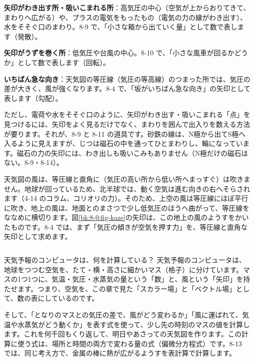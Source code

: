\begin{enumerate}[label={\bkcircled[\bkTT]{\arabic*}}, leftmargin=2.4\zw, itemsep=2pt, topsep=2pt]
\item \textbf{矢印がわき出す所・吸いこまれる所}：高気圧の中心（空気が上からおりてきて、まわりへ広がる）や、プラスの電気をもったもの（電気の力の線がわき出す）、水をそそぐ口のまわり。8-9 で、「小さな箱から出ていく量」として数で表します（発散）。
\item \textbf{矢印がうずを巻く所}：低気圧や台風の中心。8-10 で、「小さな風車が回るかどうか」として数で表します（回転）。
\item \textbf{いちばん急な向き}：天気図の等圧線（気圧の等高線）のつまった所では、気圧の差が大きく、風が強くなります。8-4 で、「坂がいちばん急な向き」の矢印として表します（勾配）。
\end{enumerate}

ただし、電荷や水をそそぐ口のように、矢印がわき出す・吸いこまれる「点」を見つけるには、矢印をよく見るだけでなく、まわりを囲んで出入りを数える方法が要ります。それが、8-9 と 8-11 の道具です。砂鉄の線は、N極から出てS極へ入るように見えますが、じつは磁石の中を通ってひとまわりし、輪になっています。磁石の力の矢印には、わき出しも吸いこみもありません（N極だけの磁石はない。8-9・8-14）。

\begin{seikaku}
天気図の風は、等圧線と直角に（気圧の高い所から低い所へまっすぐ）は吹きません。地球が回っているため、北半球では、動く空気は進む向きの右へそらされます（4-14 のコラム、コリオリの力）。そのため、上空の風は等圧線にほぼ平行に吹き、地上の風は、地面とのまさつで少し低気圧のほうへ曲がって、等圧線をななめに横切ります。図\ref{bk:8-0:fig-kaze}の矢印は、この地上の風のようすをかいたものです。8-4 では、まず「気圧の傾きが空気を押す力」を、等圧線と直角な矢印として求めます。
\end{seikaku}

\begin{column}{天気予報のコンピュータは、何を計算している？}
天気予報のコンピュータは、地球をつつむ空気を、たて・横・高さに細かいマス（格子）に分けています。マスの1つ1つに、気温・気圧・水蒸気の量という「数」と、風という「矢印」を持たせます。つまり、空気を、この章で見た「スカラー場」と「ベクトル場」として、数の表にしているのです。

そして、「となりのマスとの気圧の差で、風がどう変わるか」「風に運ばれて、気温や水蒸気がどう動くか」を表す式を使って、少し先の時刻のマスの値を計算します。これを何千回もくり返して、明日やあさっての天気図を作ります。この計算に使う式は、場所と時間の両方で変わる量の式（偏微分方程式）です。8-13 では、同じ考え方で、金属の棒に熱が広がるようすを表計算で計算します。
\end{column}

